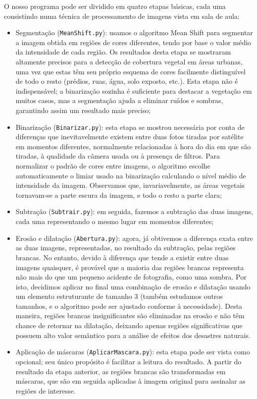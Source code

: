 \documentclass{article}
\begin{document}
O nosso programa pode ser dividido em quatro etapas básicas, cada uma consistindo numa técnica de processamento de imagens vista em sala de aula:
\begin{itemize}
  \item Segmentação (\texttt{MeanShift.py}): usamos o algoritmo Mean Shift para segmentar a imagem obtida em regiões de cores diferentes, tendo por base o valor médio da intensidade de cada região. Os resultados desta etapa se mostraram altamente precisos para a detecção de cobertura vegetal em áreas urbanas, uma vez que estas têm seu próprio esquema de cores facilmente distinguível de todo o resto (prédios, ruas, água, solo exposto, etc.). Esta etapa não é indispensável; a binarização sozinha é suficiente para destacar a vegetação em muitos casos, mas a segmentação ajuda a eliminar ruídos e sombras, garantindo assim um resultado mais preciso;
  \item Binarização (\texttt{Binarizar.py}): esta etapa se mostrou necessária por conta de diferenças que inevitavelmente existem entre duas fotos tiradas por satélite em momentos diferentes, normalmente relacionadas à hora do dia em que são tiradas, à qualidade da câmera usada ou à presença de filtros. Para normalizar o padrão de cores entre imagens, o algoritmo escolhe automaticamente o limiar usado na binarização calculando o nível médio de intensidade da imagem. Observamos que, invariavelmente, as áreas vegetais tornavam-se a parte escura da imagem, e todo o resto a parte clara;
  \item Subtração (\texttt{Subtrair.py}): em seguida, fazemos a subtração das duas imagens, cada uma representando o mesmo lugar em momentos diferentes;
  \item Erosão e dilatação (\texttt{Abertura.py}): agora, já obtivemos a diferença exata entre as duas imagens, representadas, no resultado da subtração, pelas regiões brancas. No entanto, devido à diferença que tende a existir entre duas imagens quaisquer, é provável que a maioria das regiões brancas representa não mais do que um pequeno acidente de fotografia, como uma sombra. Por isto, decidimos aplicar no final uma combinação de erosão e dilatação usando um elemento estruturante de tamanho 3 (também estudamos outros tamanhos, e o algoritmo pode ser ajustado conforme à necessidade). Desta maneira, regiões brancas insignificantes são eliminadas na erosão e não têm chance de retornar na dilatação, deixando apenas regiões significativas que possuem alto valor semântico para a análise de efeitos dos desastres naturais.
  \item Aplicação de máscaras (\texttt{AplicarMascara.py}): esta etapa pode ser vista como opcional; seu único propósito é facilitar a leitura do resultado. A partir do resultado da etapa anterior, as regiões brancas são transformadas em máscaras, que são em seguida aplicadas à imagem original para assinalar as regiões de interesse.
\end{itemize}
\end{document}
